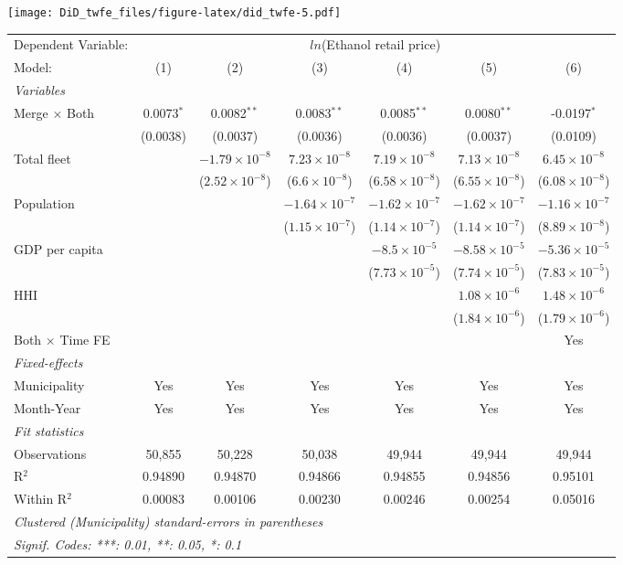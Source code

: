 \documentclass[
]{article}
\begin{document}
\texttt{[image: DiD\_twfe\_files/figure-latex/did\_twfe-5.pdf]}

\begin{tabular}{lcccccc}
\tabularnewline\midrule\midrule
Dependent Variable:&\multicolumn{6}{c}{$ln$(Ethanol retail price)}\\
Model:&(1) & (2) & (3) & (4) & (5) & (6)\\
\midrule \emph{Variables}&   &   &   &   &   &  \\
Merge $\times $ Both & 0.0073$^{*}$ & 0.0082$^{**}$ & 0.0083$^{**}$ & 0.0085$^{**}$ & 0.0080$^{**}$ & -0.0197$^{*}$\\
  &(0.0038) & (0.0037) & (0.0036) & (0.0036) & (0.0037) & (0.0109)\\
Total fleet &    & $-1.79\times 10^{-8}$ & $7.23\times 10^{-8}$ & $7.19\times 10^{-8}$ & $7.13\times 10^{-8}$ & $6.45\times 10^{-8}$\\
  &   & ($2.52\times 10^{-8}$) & ($6.6\times 10^{-8}$) & ($6.58\times 10^{-8}$) & ($6.55\times 10^{-8}$) & ($6.08\times 10^{-8}$)\\
Population &    &    & $-1.64\times 10^{-7}$ & $-1.62\times 10^{-7}$ & $-1.62\times 10^{-7}$ & $-1.16\times 10^{-7}$\\
  &   &    & ($1.15\times 10^{-7}$) & ($1.14\times 10^{-7}$) & ($1.14\times 10^{-7}$) & ($8.89\times 10^{-8}$)\\
GDP per capita &    &    &    & $-8.5\times 10^{-5}$ & $-8.58\times 10^{-5}$ & $-5.36\times 10^{-5}$\\
  &   &    &    & ($7.73\times 10^{-5}$) & ($7.74\times 10^{-5}$) & ($7.83\times 10^{-5}$)\\
HHI &    &    &    &    & $1.08\times 10^{-6}$ & $1.48\times 10^{-6}$\\
  &   &    &    &    & ($1.84\times 10^{-6}$) & ($1.79\times 10^{-6}$)\\
Both $\times$ Time FE &  &  &  &  &  & Yes\\
\midrule \emph{Fixed-effects}&   &   &   &   &   &  \\
Municipality & Yes & Yes & Yes & Yes & Yes & Yes\\
Month-Year & Yes & Yes & Yes & Yes & Yes & Yes\\
\midrule \emph{Fit statistics}&  & & & & & \\
Observations & 50,855&50,228&50,038&49,944&49,944&49,944\\
R$^2$ & 0.94890&0.94870&0.94866&0.94855&0.94856&0.95101\\
Within R$^2$ & 0.00083&0.00106&0.00230&0.00246&0.00254&0.05016\\
\midrule\midrule\multicolumn{7}{l}{\emph{Clustered (Municipality) standard-errors in parentheses}}\\
\multicolumn{7}{l}{\emph{Signif. Codes: ***: 0.01, **: 0.05, *: 0.1}}\\
\end{tabular}
\end{document}
